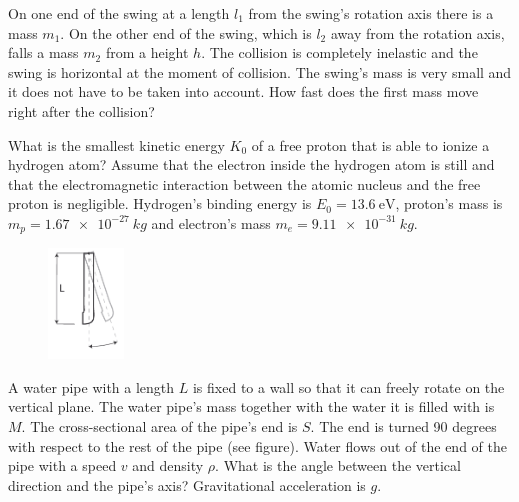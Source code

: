 \documentclass[11pt]{article}
\begin{document}

\probeng
On one end of the swing at a length $l_1$ from the swing’s rotation axis there is a mass $m_1$. On the other end of the swing, which is $l_2$ away from the rotation axis, falls a mass $m_2$ from a height $h$. The collision is completely inelastic and the swing is horizontal at the moment of collision. The swing’s mass is very small and it does not have to be taken into account. How fast does the first mass move right after the collision?
\probend
\bigskip


\probeng
What is the smallest kinetic energy $K_0$ of a free proton that is able to ionize a hydrogen atom? Assume that the electron inside the hydrogen atom is still and that the electromagnetic interaction between the atomic nucleus and the free proton is negligible. Hydrogen’s binding energy is $E_0 = \SI{13.6}{\electronvolt}$, proton’s mass is $m_p=\SI{1.67e-27}{kg}$ and electron’s mass $m_e=\SI{9.11e-31}{kg}$.
\probend
\bigskip


\probeng
\begin{figure}
  \vspace{-35pt}
  \begin{center}
    \includegraphics[width=0.18\textwidth]{2015-v2g-05-toru}
  \end{center}
  \vspace*{-10pt}
\end{figure}
A water pipe with a length $L$ is fixed to a wall so that it can freely rotate on the vertical plane. The water pipe’s mass together with the water it is filled with is $M$. The cross-sectional area of the pipe’s end is $S$. The end is turned 90 degrees with respect to the rest of the pipe (see figure). Water flows out of the end of the pipe with a speed $v$ and density $\rho$. What is the angle between the vertical direction and the pipe’s axis? Gravitational acceleration is $g$.
\probend
\bigskip
\end{document}

